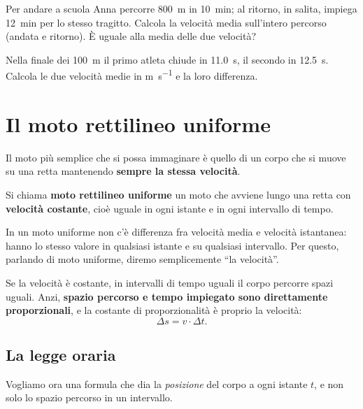 \begin{esercizio}
Per andare a scuola Anna percorre \SI{800}{\metre} in \SI{10}{\minute}; al ritorno, in salita, impiega \SI{12}{\minute} per lo stesso tragitto. Calcola la velocità media sull'intero percorso (andata e ritorno). È uguale alla media delle due velocità?\\
\end{esercizio}

\begin{esercizio}
Nella finale dei \SI{100}{\metre} il primo atleta chiude in \SI{11,0}{\second}, il secondo in \SI{12,5}{\second}. Calcola le due velocità medie in \si{\metre\per\second} e la loro differenza.\\
\end{esercizio}

\section{Il moto rettilineo uniforme}

Il moto più semplice che si possa immaginare è quello di un corpo che si muove su una retta mantenendo \textbf{sempre la stessa velocità}.

\begin{definizione}
Si chiama \textbf{moto rettilineo uniforme} un moto che avviene lungo una retta con \textbf{velocità costante}, cioè uguale in ogni istante e in ogni intervallo di tempo.
\end{definizione}

\begin{remark}
In un moto uniforme non c'è differenza fra velocità media e velocità istantanea: hanno lo stesso valore in qualsiasi istante e su qualsiasi intervallo. Per questo, parlando di moto uniforme, diremo semplicemente ``la velocità''.
\end{remark}

Se la velocità è costante, in intervalli di tempo uguali il corpo percorre spazi uguali. Anzi, \textbf{spazio percorso e tempo impiegato sono direttamente proporzionali}, e la costante di proporzionalità è proprio la velocità:
\[ \Delta s = v \cdot \Delta t. \]

\subsection{La legge oraria}
Vogliamo ora una formula che dia la \emph{posizione} del corpo a ogni istante $t$, e non solo lo spazio percorso in un intervallo.

